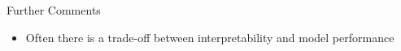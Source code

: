 \documentclass[11pt,compress,t,notes=noshow, aspectratio=169, xcolor=table]{beamer}
\begin{document}
\begin{frame}{Further Comments}
\begin{itemize}
        \item<3-> Often there is a trade-off between interpretability and model performance 
    \end{itemize}

\end{frame}
\end{document}
